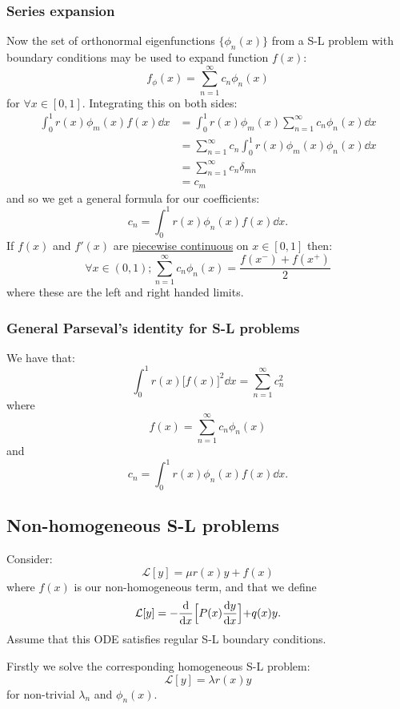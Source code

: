 \documentclass{article}
\begin{document}
\begin{multicols}{3}
\subsubsection{Series expansion}
Now the set of orthonormal eigenfunctions $\{\phi_n(x)\}$
from a S-L problem with boundary conditions
may be used to expand function $f(x)$:
$$f_\phi(x)=\sum_{n=1}^{\infty} c_n\phi_n(x)$$
for $\forall x\in[0,1]$. Integrating this on both sides:
\begin{align*}
    \int_{0}^{1}r(x)\phi_m(x)f(x)\dd x
    &=\int_{0}^{1}r(x)\phi_m(x)
    \sum_{n=1}^{\infty} c_n\phi_n(x)\dd x \\
    &=\sum_{n=1}^{\infty} c_n
    \int_{0}^{1}r(x)\phi_m(x)\phi_n(x)\dd x \\
    &=\sum_{n=1}^{\infty} c_n\delta_{mn} \\
    &=c_m
\end{align*}
and so we get a general formula for our coefficients:
$$c_n=\int_{0}^{1}r(x)\phi_n(x)f(x)\dd x.$$
If $f(x)$ and $f'(x)$ are \underline{piecewise continuous}
on $x\in[0,1]$ then:
$$\forall x\in(0,1);\sum_{n=1}^{\infty} c_n\phi_n(x)
=\frac{f(x^-)+f(x^+)}{2}$$
where these are the left and right handed limits.

\subsubsection{General Parseval's identity for S-L problems}
We have that:
$$\int_{0}^{1}r(x)\bigl[f(x)\bigr]^2\dd x
=\sum_{n=1}^{\infty}c_n^2$$
where
$$f(x)=\sum_{n=1}^{\infty} c_n\phi_n(x)$$
and
$$c_n=\int_{0}^{1}r(x)\phi_n(x)f(x)\dd x.$$

\subsection{Non-homogeneous S-L problems}
Consider:
$$\mathcal{L}[y]=\mu r(x)y+f(x)$$
where $f(x)$ is our non-homogeneous term, and that we define
$$\mathcal{L}[y]=-\dv{x}\Bigl[P(x)\dv{y}{x}\Bigl]+q(x)y.$$
Assume that this ODE satisfies regular S-L boundary conditions.

Firstly we solve the corresponding homogeneous S-L problem:
$$\mathcal{L}[y]=\lambda r(x)y$$
for non-trivial $\lambda_n$ and $\phi_n(x)$.


\end{multicols}
\end{document}
